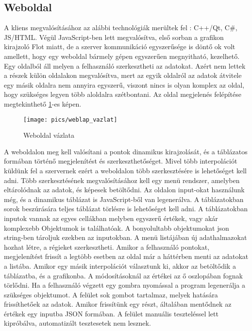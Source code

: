 \subsection{Weboldal}
	A kliens megvalósításához az alábbi technológiák merültek fel : C++/Qt, C\#, JS/HTML. Végül JavaScript-ben lett megvalósítva, első sorban a grafikon kirajzoló Flot miatt, de a szerver kommunikáció egyszerűsége is döntő ok volt amellett, hogy egy weboldal bármely gépen egyszerűen megnyitható, kezelhető.\newline
	Egy oldalból áll melyen a felhasználó szerkesztheti az adatokat. Azért nem lettek a részek külön oldalakon megvalósítva, mert az egyik oldalról az adatok átvitele egy másik oldalra nem annyira egyszerű, viszont nincs is olyan komplex az oldal, hogy szükséges legyen több aloldalra szétbontani. 
	Az oldal megjelenés felépítése megtekinthető \ref{fig:weblap_vazlat}-es képen.
	\begin{figure}[h]
	\texttt{[image: pics/weblap\_vazlat]}
	\centering
	\caption{Weboldal vázlata\label{fig:weblap_vazlat}}
	\end{figure}
	A weboldalon meg kell valósítani a pontok dinamikus kirajzolását, és a táblázatos formában történő megjelenítést és szerkeszthetőséget. Mivel több interpolációt küldünk fel a szervernek ezért a weboldalon több szerkesztésére is lehetőséget kell adni. \newline 
	Több szerkesztésének megvalósításához kell egy menü rendszer, amelyben eltárolódnak az adatok, és képesek betöltődni.\newline
	Az oldalon input-okat használunk még, és a dinamikus táblázat is JavaScript-ből van legenerálva. A táblázatokban sorok beszúrására teljes táblázat törlésre is lehetőséget kell adni. 
	A táblázatokban inputok vannak az egyes cellákban melyben egyszerű értékek, vagy akár komplexebb Objektumok is találhatóak. A bonyolultabb objektumokat json string-ben tároljuk ezekben az inputokban. \newline
	A menü listájában új adathalmazokat hozhat létre, a régieket szerkesztheti.
	Amikor a felhasználó pontokat, megjelenítést frissít a legtöbb esetben az oldal már a háttérben menti az adatokat a listába. Amikor egy másik interpolációt választunk ki, akkor az betöltődik a táblázatba, és a grafikonba. A módosításoknál az értékei az ő oszlopában fognak törlődni.
	Ha a felhasználó végzett egy gombra nyomással a program legenerálja a szükséges objektumot. \newline
	A felület sok gombot tartalmaz, melyek hatására frissíthetőek az adatok. Amikor frissítünk egy részt, általában mentődnek az értékek egy inputba JSON formában.\newline
	A felület manuális teszteléssel lett kipróbálva, automatizált tesztesetek nem lesznek.
